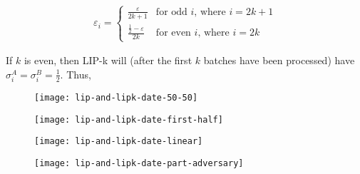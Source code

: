 \begin{align*}
\varepsilon_i = 
    \begin{cases}
    \frac{\varepsilon}{2k+1} & \text{for odd $i$, where $i = 2k + 1$} \\ 
    \frac{\frac{1}{2} - \varepsilon}{2k} & \text{for even $i$, where $i = 2k$}
    \end{cases}
\end{align*}

If $k$ is even, then LIP-k will (after the first $k$ batches have been processed) have $\sigma^A_i = \sigma^B_i = \frac{1}{2}$. Thus,

\begin{figure}
    \centering
    \texttt{[image: lip-and-lipk-date-50-50]}
    \caption{}
    \label{fig:cr}
\end{figure}

\begin{figure}
    \centering
    \texttt{[image: lip-and-lipk-date-first-half]}
    \caption{}
    \label{fig:cr}
\end{figure}

\begin{figure}
    \centering
    \texttt{[image: lip-and-lipk-date-linear]}
    \caption{}
    \label{fig:cr}
\end{figure}

\begin{figure}
    \centering
    \texttt{[image: lip-and-lipk-date-part-adversary]}
    \caption{}
    \label{fig:cr}
\end{figure}

